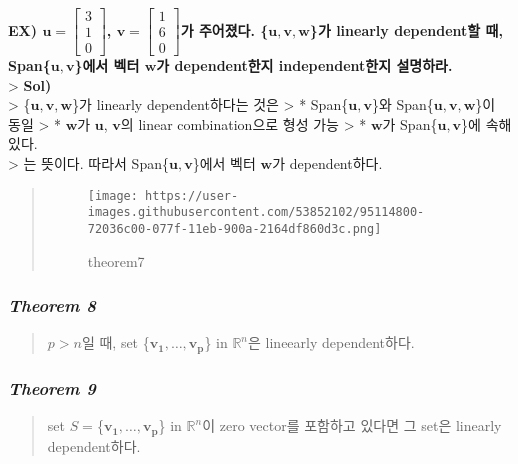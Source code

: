 \documentclass[11pt]{article}
\begin{document}
\textbf{EX) \(\mathbf{u} = \begin{bmatrix} 3\\1\\0 \end{bmatrix}\),
\(\mathbf{v} = \begin{bmatrix} 1\\6\\0 \end{bmatrix}\)가 주어졌다.
\{\(\mathbf{u, v, w}\)\}가 linearly dependent할 때,
Span\{\(\mathbf{u, v}\)\}에서 벡터 \(\mathbf{w}\)가 dependent한지
independent한지 설명하라.}\\
\textgreater{} \textbf{Sol)}\\
\textgreater{} \{\(\mathbf{u, v, w}\)\}가 linearly dependent하다는 것은
\textgreater{} * Span\{\(\mathbf{u, v}\)\}와
Span\{\(\mathbf{u, v, w}\)\}이 동일 \textgreater{} * \(\mathbf{w}\)가
\(\mathbf{u}\), \(\mathbf{v}\)의 linear combination으로 형성 가능
\textgreater{} * \(\mathbf{w}\)가 Span\{\(\mathbf{u, v}\)\}에
속해있다.\\
\textgreater{} 는 뜻이다. 따라서 Span\{\(\mathbf{u, v}\)\}에서 벡터
\(\mathbf{w}\)가 dependent하다.

\begin{quote}
\begin{figure}
\centering
\texttt{[image: https://user-images.githubusercontent.com/53852102/95114800-72036c00-077f-11eb-900a-2164df860d3c.png]}
\caption{theorem7}
\end{figure}
\end{quote}

    \hypertarget{theorem-8}{%
\subsubsection{\texorpdfstring{\emph{Theorem
8}}{Theorem 8}}\label{theorem-8}}

\begin{quote}
\(p>n\)일 때, set \{\(\mathbf{v_{1}}, \dots, \mathbf{v_{p}}\)\} in
\(\mathbb{R}^n\)은 lineearly dependent하다.
\end{quote}

\hypertarget{theorem-9}{%
\subsubsection{\texorpdfstring{\emph{Theorem
9}}{Theorem 9}}\label{theorem-9}}

\begin{quote}
set \(S =\)\{\(\mathbf{v_{1}}, \dots, \mathbf{v_{p}}\)\} in
\(\mathbb{R}^n\)이 zero vector를 포함하고 있다면 그 set은 linearly
dependent하다.
\end{quote}
\end{document}

